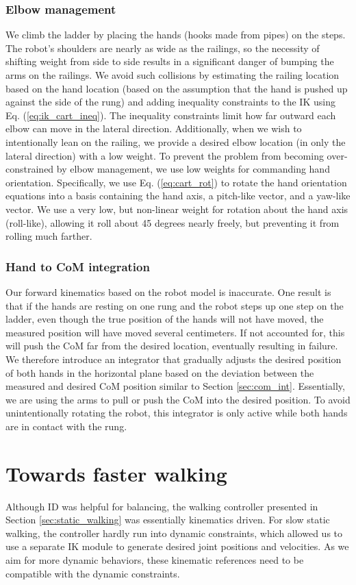 \documentclass{ws-ijhr}
\newcommand{\eref}[1] {Eq. (\ref{#1})}
\newcommand{\sref}[1] {Section \ref{#1}}
\begin{document}
\subsubsection{Elbow management}
We climb the ladder by placing the hands (hooks made from pipes) on the steps.
The robot's shoulders are nearly as wide as the railings, so the necessity of 
shifting weight from side to side results in a significant danger of bumping 
the arms on the railings. We avoid such collisions by estimating the railing 
location based on the hand location (based on the assumption that the hand 
is pushed up against the side of the rung) and adding inequality constraints 
to the IK using \eref{eq:ik_cart_ineq}. 
The inequality constraints limit how far outward each elbow can 
move in the lateral direction. Additionally, when we wish to intentionally 
lean on the railing, we provide a desired elbow location (in only the 
lateral direction) with a low weight. To prevent the problem from becoming 
over-constrained by elbow management, we use low weights for commanding hand 
orientation. Specifically, we use \eref{eq:cart_rot} to rotate the hand 
orientation equations into a basis containing the hand axis, a pitch-like 
vector, and a yaw-like vector. We use a very low, but non-linear weight for 
rotation about the hand axis (roll-like), allowing it roll about 45 degrees 
nearly freely, but preventing it from rolling much farther.

\subsubsection{Hand to CoM integration}
Our forward kinematics based on the robot model is inaccurate. 
One result is that if 
the hands are resting on one rung and the robot steps up one step on the 
ladder, even though the true position of the hands will not have moved, the 
measured position will have moved several centimeters. If not accounted for, 
this will push the CoM far from the desired location, eventually resulting 
in failure. We therefore introduce an integrator that gradually adjusts the 
desired position of both hands in the horizontal plane based on the deviation 
between the measured and desired CoM position similar to \sref{sec:com_int}. 
Essentially, we are using the 
arms to pull or push the CoM into the desired position. To avoid unintentionally 
rotating the robot, this integrator is only active while both hands are in 
contact with the rung. 

\section{Towards faster walking}
\label{sec:new_stuff}
Although ID was helpful for balancing, the walking controller presented in 
\sref{sec:static_walking} was essentially kinematics driven. 
For slow static walking, the controller hardly run into dynamic constraints, 
which allowed us to use a separate IK module to generate desired joint 
positions and velocities. 
As we aim for more dynamic behaviors, these kinematic references need to be 
compatible with the dynamic constraints. 
\end{document}
